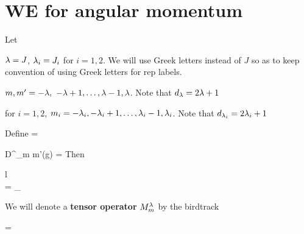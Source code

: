 \section{WE for angular momentum}
Let

$\lambda=J$, $\lambda_i=J_i$ for $i=1,2$.
We will use Greek letters instead of $J$
so as to keep
convention
of using Greek
letters for rep labels. 

$m, m'= -\lambda, \
-\lambda+1,\ldots, \lambda-1, \lambda$. Note that
$d_\lambda = 2\lambda + 1$
 
for $i=1,2$, $m_i= -\lambda_i, -\lambda_i +1,\ldots, \lambda_i-1, \lambda_i$.  Note
that
$d_{\lambda_i} = 2\lambda_i + 1$ 



Define
\beq
{}
\quad
=\quad
\bcen
{}
\ecen
\eeq

\beq
D^\lam_{m m'}(g)
\quad =\quad
{}
\eeq
Then


\beq
\begin{array}{l}
\\
\bcen
{}
\ecen
=
\sum_\lam
\bcen
{}
\ecen
\end{array}
\eeq

We will denote a
{\bf tensor operator} $M^\lambda_m$ by
the birdtrack

\beq
{}
=
\bcen
{}
\ecen
\eeq

